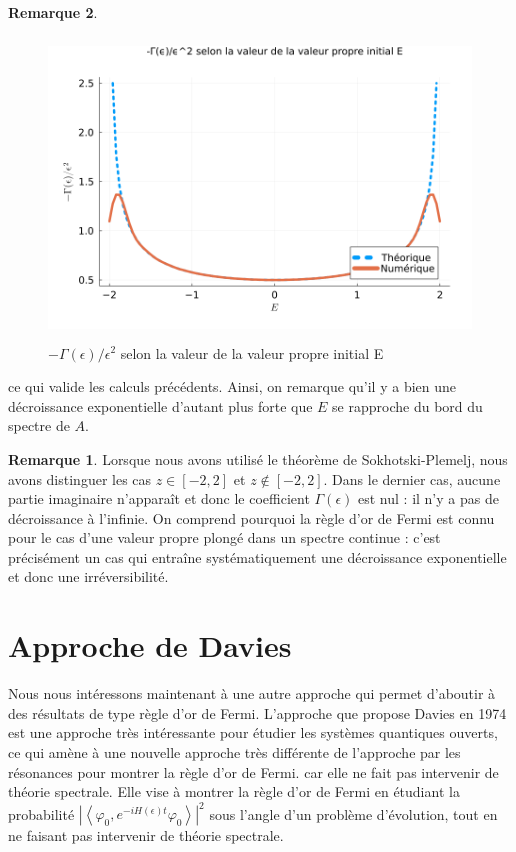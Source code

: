 \documentclass[12pt,openany,a4paper, titlepage]{article}
\newcommand{\la}{\left\langle}
\newcommand{\ra}{\right\rangle}
\newcommand{\vp}{\varphi}
\theoremstyle{definition}
\theoremstyle{definition}
\theoremstyle{definition}
\theoremstyle{definition}
\theoremstyle{definition}
\newtheorem{rem}{Remarque}
\theoremstyle{definition}
\begin{document}
\begin{rem}
\begin{figure}[h]
    \centering
        \includegraphics[height=8cm]{Γ(ϵ) selon la valeur de la valeur propre initial E.png}
        \caption{$-\Gamma(\epsilon)/\epsilon^2$ selon la valeur de la valeur propre initial E}
\end{figure}
ce qui valide les calculs précédents. Ainsi, on remarque qu'il y a bien une décroissance exponentielle d'autant plus forte que $E$ se rapproche du bord du spectre de $A$.

\begin{rem}
    Lorsque nous avons utilisé le théorème de Sokhotski-Plemelj, nous avons distinguer les cas $z\in[-2,2]$ et $z\notin[-2,2]$. Dans le dernier cas, aucune partie imaginaire n'apparaît et donc le coefficient $\Gamma(\epsilon)$ est nul : il n'y a pas de décroissance à l'infinie. On comprend pourquoi la règle d'or de Fermi est connu pour le cas d'une valeur propre plongé dans un spectre continue : c'est précisément un cas qui entraîne systématiquement une décroissance exponentielle et donc une irréversibilité.
\end{rem}


\newpage
\section{Approche de Davies}

Nous nous intéressons maintenant à une autre approche qui permet d'aboutir à des résultats de type règle d'or de Fermi. L'approche que propose Davies \cite{davies} en 1974 est une approche très intéressante pour étudier les systèmes quantiques ouverts, ce qui amène à une nouvelle approche très différente de l'approche par les résonances pour montrer la règle d'or de Fermi. car elle ne fait pas intervenir de théorie spectrale. Elle vise à montrer la règle d'or de Fermi en étudiant la probabilité $\left|\la \vp_0 , e^{-iH(\epsilon) t} \vp_0\ra\right|^2$ sous l'angle d'un problème d'évolution, tout en ne faisant pas intervenir de théorie spectrale.  


\end{rem}
\end{document}
